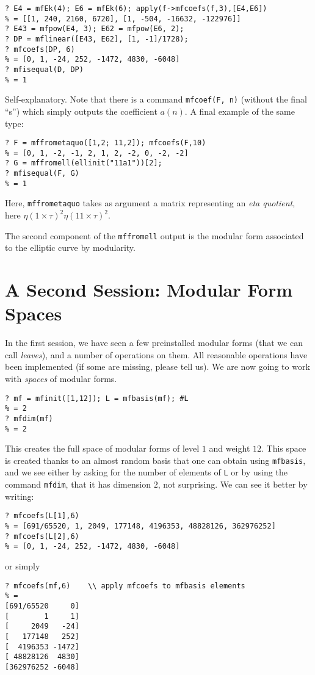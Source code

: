 \documentclass[11pt]{article}
\def\kbd#1{{\tt #1}}
\begin{document}
\begin{verbatim}
? E4 = mfEk(4); E6 = mfEk(6); apply(f->mfcoefs(f,3),[E4,E6])
% = [[1, 240, 2160, 6720], [1, -504, -16632, -122976]]
? E43 = mfpow(E4, 3); E62 = mfpow(E6, 2);
? DP = mflinear([E43, E62], [1, -1]/1728);
? mfcoefs(DP, 6)
% = [0, 1, -24, 252, -1472, 4830, -6048]
? mfisequal(D, DP)
% = 1
\end{verbatim}

Self-explanatory. Note that there is a command \kbd{mfcoef(F, n)} (without
the final ``s'') which simply outputs the coefficient $a(n)$.
A final example of the same type:

\begin{verbatim}
? F = mffrometaquo([1,2; 11,2]); mfcoefs(F,10)
% = [0, 1, -2, -1, 2, 1, 2, -2, 0, -2, -2]
? G = mffromell(ellinit("11a1"))[2];
? mfisequal(F, G)
% = 1
\end{verbatim}

  Here, \kbd{mffrometaquo} takes as argument a matrix representing an
  \emph{eta quotient}, here $\eta(1\times\tau)^2\eta(11\times\tau)^2$.

  The second component of the \kbd{mffromell} output is
  the modular form associated to the elliptic curve by modularity.

\section{A Second Session: Modular Form Spaces}

In the first session, we have seen a few preinstalled modular forms (that
we can call \emph{leaves}), and a number of operations on them. All reasonable
operations have been implemented (if some are missing, please tell us). We are
now going to work with \emph{spaces} of modular forms.

\begin{verbatim}
? mf = mfinit([1,12]); L = mfbasis(mf); #L
% = 2
? mfdim(mf)
% = 2
\end{verbatim}

This creates the full space of modular forms of level $1$ and weight $12$.
This space is created thanks to an almost random basis that one can obtain
using \kbd{mfbasis}, and we see either by asking for the number of elements
of \kbd{L} or by using the command \kbd{mfdim}, that it has dimension $2$,
not surprising. We can see it better by writing:

\begin{verbatim}
? mfcoefs(L[1],6)
% = [691/65520, 1, 2049, 177148, 4196353, 48828126, 362976252]
? mfcoefs(L[2],6)
% = [0, 1, -24, 252, -1472, 4830, -6048]
\end{verbatim}
or simply
\begin{verbatim}
? mfcoefs(mf,6)    \\ apply mfcoefs to mfbasis elements
% =
[691/65520     0]
[        1     1]
[     2049   -24]
[   177148   252]
[  4196353 -1472]
[ 48828126  4830]
[362976252 -6048]
\end{verbatim}
\end{document}
